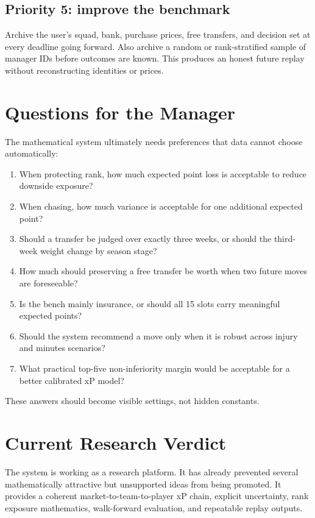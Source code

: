 \documentclass[11pt,a4paper]{article}
\begin{document}
\subsection{Priority 5: improve the benchmark}

Archive the user's squad, bank, purchase prices, free transfers, and decision set at every deadline going forward. Also archive a random or rank-stratified sample of manager IDs before outcomes are known. This produces an honest future replay without reconstructing identities or prices.

\section{Questions for the Manager}

The mathematical system ultimately needs preferences that data cannot choose automatically:

\begin{enumerate}
  \item When protecting rank, how much expected point loss is acceptable to reduce downside exposure?
  \item When chasing, how much variance is acceptable for one additional expected point?
  \item Should a transfer be judged over exactly three weeks, or should the third-week weight change by season stage?
  \item How much should preserving a free transfer be worth when two future moves are foreseeable?
  \item Is the bench mainly insurance, or should all 15 slots carry meaningful expected points?
  \item Should the system recommend a move only when it is robust across injury and minutes scenarios?
  \item What practical top-five non-inferiority margin would be acceptable for a better calibrated xP model?
\end{enumerate}

These answers should become visible settings, not hidden constants.

\section{Current Research Verdict}

The system is working as a research platform. It has already prevented several mathematically attractive but unsupported ideas from being promoted. It provides a coherent market-to-team-to-player xP chain, explicit uncertainty, rank exposure mathematics, walk-forward evaluation, and repeatable replay outputs.
\end{document}
